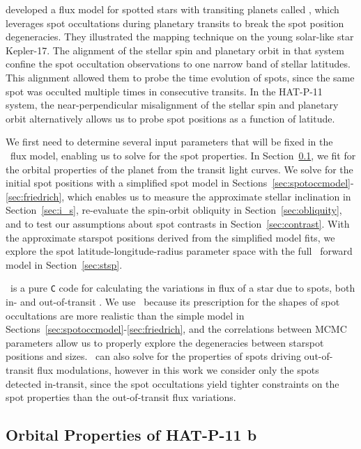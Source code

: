 \citet{Hebb2017} developed a flux model for spotted stars with transiting planets called \stsp, which leverages spot occultations during planetary transits to break the spot position degeneracies. They illustrated the mapping technique on the young solar-like star Kepler-17. The alignment of the stellar spin and planetary orbit in that system confine the spot occultation observations to one narrow band of stellar latitudes. This alignment allowed them to probe the time evolution of spots, since the same spot was occulted multiple times in consecutive transits. In the HAT-P-11 system, the near-perpendicular misalignment of the stellar spin and planetary orbit alternatively allows us to probe spot positions as a function of latitude.

We first need to determine several input parameters that will be fixed in the \stsp\ flux model, enabling us to solve for the spot properties. In Section~\ref{sec:transit}, we fit for the orbital properties of the planet from the transit light curves. We solve for the initial spot positions with a simplified spot model in Sections~\ref{sec:spotoccmodel}-\ref{sec:friedrich}, which enables us to measure the approximate stellar inclination in Section~\ref{sec:i_s}, re-evaluate the spin-orbit obliquity in Section~\ref{sec:obliquity}, and to test our assumptions about spot contrasts in Section~\ref{sec:contrast}. With the approximate starspot positions derived from the simplified model fits, we explore the spot latitude-longitude-radius parameter space with the full \stsp\ forward model in Section~\ref{sec:stsp}. 

\stsp\ is a pure \texttt{C} code for calculating the variations in flux of a star due to spots, both in- and out-of-transit  \citep{Hebb2017}. We use \stsp\ because its prescription for the shapes of spot occultations are more realistic than the simple model in Sections~\ref{sec:spotoccmodel}-\ref{sec:friedrich}, and the correlations between MCMC parameters allow us to properly explore the degeneracies between starspot positions and sizes. \stsp\ can also solve for the properties of spots driving out-of-transit flux modulations, however in this work we consider only the spots detected in-transit, since the spot occultations yield tighter constraints on the spot properties than the out-of-transit flux variations.

\subsection{Orbital Properties of HAT-P-11 \lowercase{b}} \label{sec:transit}


